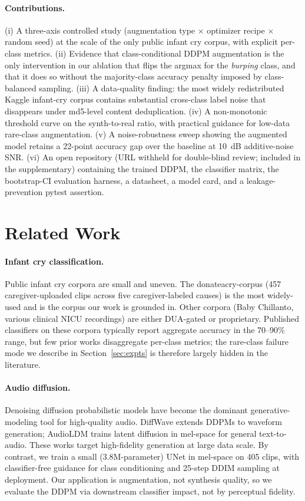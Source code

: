 \documentclass[10pt]{article}
\begin{document}
\paragraph{Contributions.}
(i) A three-axis controlled study (augmentation type $\times$ optimizer recipe $\times$ random seed) at the scale of the only public infant cry corpus, with explicit per-class metrics. (ii) Evidence that class-conditional DDPM augmentation is the only intervention in our ablation that flips the argmax for the \textit{burping} class, and that it does so without the majority-class accuracy penalty imposed by class-balanced sampling. (iii) A data-quality finding: the most widely redistributed Kaggle infant-cry corpus contains substantial cross-class label noise that disappears under md5-level content deduplication. (iv) A non-monotonic threshold curve on the synth-to-real ratio, with practical guidance for low-data rare-class augmentation. (v) A noise-robustness sweep showing the augmented model retains a 22-point accuracy gap over the baseline at 10~dB additive-noise SNR. (vi) An open repository (URL withheld for double-blind review; included in the supplementary) containing the trained DDPM, the classifier matrix, the bootstrap-CI evaluation harness, a datasheet, a model card, and a leakage-prevention pytest assertion.

\section{Related Work}\label{sec:past}

\paragraph{Infant cry classification.} Public infant cry corpora are small and uneven. The donateacry-corpus \citep{donateacry} (457 caregiver-uploaded clips across five caregiver-labeled causes) is the most widely-used and is the corpus our work is grounded in. Other corpora (Baby Chillanto, various clinical NICU recordings) are either DUA-gated or proprietary. Published classifiers on these corpora typically report aggregate accuracy in the 70--90\% range, but few prior works disaggregate per-class metrics; the rare-class failure mode we describe in Section~\ref{sec:expts} is therefore largely hidden in the literature.

\paragraph{Audio diffusion.} Denoising diffusion probabilistic models \citep{ho2020denoising} have become the dominant generative-modeling tool for high-quality audio. DiffWave \citep{kong2021diffwave} extends DDPMs to waveform generation; AudioLDM \citep{liu2023audioldm} trains latent diffusion in mel-space for general text-to-audio. These works target high-fidelity generation at large data scale. By contrast, we train a small (3.8M-parameter) UNet in mel-space on 405 clips, with classifier-free guidance \citep{ho2021classifier} for class conditioning and 25-step DDIM \citep{song2021ddim} sampling at deployment. Our application is augmentation, not synthesis quality, so we evaluate the DDPM via downstream classifier impact, not by perceptual fidelity.
\end{document}
